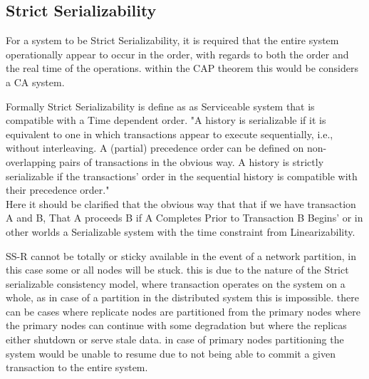 \documentclass[a4paper,10pt,titlepage]{report}
\begin{document}
\subsection{Strict Serializability}

For a system to be Strict Serializability, it is required that the entire system operationally appear to occur in the order, with regards to both the order and the real time of the operations. within the CAP theorem this would be considers a CA system.\\
\vspace{5mm}

Formally Strict Serializability is define as as Serviceable system that is compatible with a Time dependent order.
"A history is serializable if it is equivalent to one in which transactions appear to execute sequentially, i.e., without interleaving. A (partial) precedence order can be defined on non-overlapping pairs of transactions in the obvious way. A history is strictly serializable if the transactions' order in the sequential history is compatible with their precedence order." \cite{10.1145/78969.78972}\\
\vspace{5mm}
Here it should be clarified that the obvious way that that if we have transaction A and B, That A proceeds B if A Completes Prior to Transaction B Begins' or in other worlds a Serializable system with the time constraint from Linearizability.

SS-R cannot be totally or sticky available in the event of a network partition, in this case some or all nodes will be stuck. this is due to the nature of the Strict serializable consistency model, where transaction operates on the system on a whole, as in case of a partition in the distributed system this is impossible. there can be cases where replicate nodes are partitioned from the primary nodes where the primary nodes can continue with some degradation but where the replicas either shutdown or serve stale data. in case of primary nodes partitioning the system would be unable to resume due to not being able to commit a given transaction to the entire system.
\end{document}
